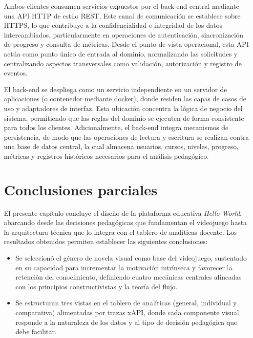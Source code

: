 Ambos clientes consumen servicios expuestos por el back-end central mediante una API HTTP de estilo REST. Este canal de comunicación se establece sobre HTTPS, lo que contribuye a la confidencialidad e integridad de los datos intercambiados, particularmente en operaciones de autenticación, sincronización de progreso y consulta de métricas. Desde el punto de vista operacional, esta API actúa como punto único de entrada al dominio, normalizando las solicitudes y centralizando aspectos transversales como validación, autorización y registro de eventos.

El back-end se despliega como un servicio independiente en un servidor de aplicaciones (o contenedor mediante docker), donde residen las capas de casos de uso y adaptadores de interfaz. Esta ubicación concentra la lógica de negocio del sistema, permitiendo que las reglas del dominio se ejecuten de forma consistente para todos los clientes. Adicionalmente, el back-end integra mecanismos de persistencia, de modo que las operaciones de lectura y escritura se realizan contra una base de datos central, la cual almacena usuarios, cursos, niveles, progreso, métricas y registros históricos necesarios para el análisis pedagógico.



\section{Conclusiones parciales}

El presente capítulo concluye el diseño de la plataforma educativa \textit{Hello World}, abarcando desde las decisiones pedagógicas que fundamentan el videojuego hasta la arquitectura técnica que lo integra con el tablero de analíticas docente. Los resultados obtenidos permiten establecer las siguientes conclusiones:

\begin{itemize}
	\item Se seleccionó el género de novela visual como base del videojuego, sustentado en su capacidad para incrementar la motivación intrínseca y favorecer la retención del conocimiento, definiendo cuatro mecánicas centrales alineadas con los principios constructivistas y la teoría del flujo.
	
	\item Se estructuran tres vistas en el tablero de analíticas (general, individual y comparativa) alimentadas por trazas xAPI, donde cada componente visual responde a la naturaleza de los datos y al tipo de decisión pedagógica que debe facilitar.
\end{itemize}
